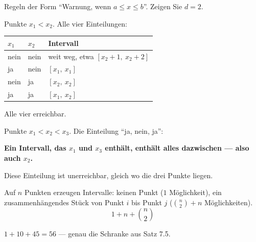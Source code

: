 \begin{aufgabe}
Regeln der Form \enquote{Warnung, wenn $a \le x \le b$}. Zeigen Sie $d = 2$.

\loesung
{}
Punkte $x_1 < x_2$. Alle vier Einteilungen:

\begin{center}
{\small
\renewcommand{\arraystretch}{1.48}
\begin{tabular}{@{}P{1.4cm}P{1.4cm}P{3.6cm}@{}}
\toprule
$x_1$ & $x_2$ & \textbf{Intervall}\\
\midrule
nein & nein & weit weg, etwa $[x_2+1,\ x_2+2]$\\
ja & nein & $[x_1,\ x_1]$\\
nein & ja & $[x_2,\ x_2]$\\
ja & ja & $[x_1,\ x_2]$\\
\bottomrule
\end{tabular}}
\end{center}

Alle vier erreichbar. \checkmark

Punkte $x_1 < x_2 < x_3$. Die Einteilung \enquote{ja, nein, ja}:

\begin{center}
\begin{minipage}{0.9\textwidth}
\textbf{Ein Intervall, das $x_1$ und $x_3$ enthält, enthält alles dazwischen --- also auch $x_2$.}
\end{minipage}
\end{center}

Diese Einteilung ist unerreichbar, gleich wo die drei Punkte liegen. \checkmark

Auf $n$ Punkten erzeugen Intervalle: keinen Punkt ($1$ Möglichkeit), ein zusammenhängendes Stück von Punkt $i$ bis Punkt $j$ ($\binom n2 + n$ Möglichkeiten).
\[ 1 + n + \binom n2 \]

 $1+10+45 = 56$ --- genau die Schranke aus Satz 7.5. \checkmark

\begin{center}
\begin{minipage}{0.88\textwidth}
\end{minipage}
\end{center}
\end{aufgabe}

